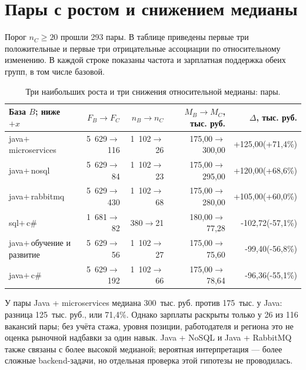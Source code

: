 \documentclass[11pt,a4paper]{article}
\begin{document}
\clearpage
\section{Пары с ростом и снижением медианы}
Порог $n_C\ge20$ прошли 293 пары. В таблице приведены первые три положительные и первые три отрицательные ассоциации по относительному изменению. В каждой строке показаны частота и зарплатная поддержка обеих групп, в том числе базовой.
\begin{table}[h!]
\centering\small
\caption{Три наибольших роста и три снижения относительной медианы: пары.}
\begin{tabularx}{\linewidth}{>{\raggedright\arraybackslash}Xrrrr}\toprule
База $B$; ниже $+x$ & $F_B\to F_C$ & $n_B\to n_C$ & $M_B\to M_C$, тыс. руб. & $\Delta$, тыс. руб.\\\midrule
java\newline $+\,$microservices & 5~629$\to$116 & 1~102$\to$26 & 175,00$\to$300,00 & +125,00\newline (+71,4\%)\\
java\newline $+\,$nosql & 5~629$\to$84 & 1~102$\to$23 & 175,00$\to$295,00 & +120,00\newline (+68,6\%)\\
java\newline $+\,$rabbitmq & 5~629$\to$430 & 1~102$\to$68 & 175,00$\to$280,00 & +105,00\newline (+60,0\%)\\
sql\newline $+\,$c\# & 1~681$\to$82 & 380$\to$21 & 180,00$\to$77,28 & -102,72\newline (-57,1\%)\\
java\newline $+\,$обучение и развитие & 5~629$\to$56 & 1~102$\to$27 & 175,00$\to$75,60 & -99,40\newline (-56,8\%)\\
java\newline $+\,$c\# & 5~629$\to$192 & 1~102$\to$66 & 175,00$\to$78,64 & -96,36\newline (-55,1\%)\\
\bottomrule\end{tabularx}
\end{table}

У пары Java + microservices медиана 300~тыс. руб. против 175~тыс. у Java: разница 125~тыс. руб., или 71,4\%. Однако зарплаты раскрыты только у 26 из 116 вакансий пары; без учёта стажа, уровня позиции, работодателя и региона это не оценка рыночной надбавки за один навык. Java + NoSQL и Java + RabbitMQ также связаны с более высокой медианой; вероятная интерпретация --- более сложные backend-задачи, но отдельная проверка этой гипотезы не проводилась.
\end{document}
